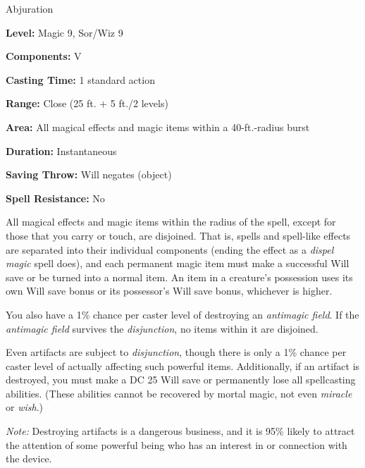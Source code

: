 
Abjuration

\textbf{Level:} Magic 9, Sor/Wiz 9

\textbf{Components:} V

\textbf{Casting Time:} 1 standard action

\textbf{Range:} Close (25 ft. + 5 ft./2 levels)

\textbf{Area:} All magical effects and magic items within a 40-ft.-radius burst

\textbf{Duration:} Instantaneous

\textbf{Saving Throw:} Will negates (object)

\textbf{Spell Resistance:} No

All magical effects and magic items within the radius of the spell, except for 
those that you carry or touch, are disjoined. That is, spells and spell-like effects 
are separated into their individual components (ending the effect as a \textit{dispel 
magic} spell does), and each permanent magic item must make a successful Will save 
or be turned into a normal item. An item in a creature's possession uses its own 
Will save bonus or its possessor's Will save bonus, whichever is higher.

You also have a 1\% chance per caster level of destroying an \textit{antimagic 
field}. If the \textit{antimagic field} survives the \textit{disjunction}, no items 
within it are disjoined.

Even artifacts are subject to \textit{disjunction}, though there is only a 1\% 
chance per caster level of actually affecting such powerful items. Additionally, 
if an artifact is destroyed, you must make a DC 25 Will save or permanently lose 
all spellcasting abilities. (These abilities cannot be recovered by mortal magic, 
not even \textit{miracle} or \textit{wish}.)

\textit{Note:} Destroying artifacts is a dangerous business, and it is 95\% likely 
to attract the attention of some powerful being who has an interest in or connection 
with the device.


